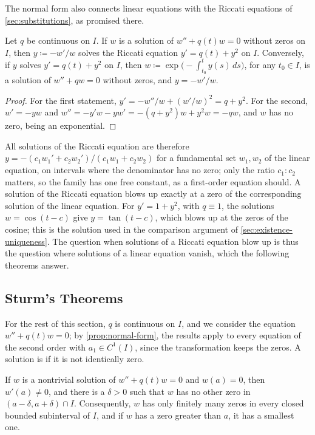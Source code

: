 The normal form also connects linear equations with the Riccati equations of \cref{sec:substitutions}, as promised there.

\begin{proposition}
\label{prop:riccati-linear}
Let $q$ be continuous on $I$. If $w$ is a solution of $w''+q(t)w=0$ without zeros on $I$, then $y\coloneqq-w'/w$ solves the Riccati equation $y'=q(t)+y^2$ on $I$. Conversely, if $y$ solves $y'=q(t)+y^2$ on $I$, then $w\coloneqq\exp\bigl(-\int_{t_0}^ty(s)\,ds\bigr)$, for any $t_0\in I$, is a solution of $w''+qw=0$ without zeros, and $y=-w'/w$.
\end{proposition}

\begin{proof}
For the first statement, $y'=-w''/w+(w'/w)^2=q+y^2$. For the second, $w'=-yw$ and $w''=-y'w-yw'=-(q+y^2)w+y^2w=-qw$, and $w$ has no zero, being an exponential.
\end{proof}

All solutions of the Riccati equation are therefore $y=-(c_1w_1'+c_2w_2')/(c_1w_1+c_2w_2)$ for a fundamental set $w_1,w_2$ of the linear equation, on intervals where the denominator has no zero; only the ratio $c_1:c_2$ matters, so the family has one free constant, as a first-order equation should. A solution of the Riccati equation blows up exactly at a zero of the corresponding solution of the linear equation. For $y'=1+y^2$, with $q\equiv1$, the solutions $w=\cos(t-c)$ give $y=\tan(t-c)$, which blows up at the zeros of the cosine; this is the solution used in the comparison argument of \cref{sec:existence-uniqueness}. The question when solutions of a Riccati equation blow up is thus the question where solutions of a linear equation vanish, which the following theorems answer.

\subsection{Sturm's Theorems}

For the rest of this section, $q$ is continuous on $I$, and we consider the equation $w''+q(t)w=0$; by \cref{prop:normal-form}, the results apply to every equation of the second order with $a_1\in C^1(I)$, since the transformation keeps the zeros. A solution is  if it is not identically zero.

\begin{lemma}
\label{lem:simple-zeros}
If $w$ is a nontrivial solution of $w''+q(t)w=0$ and $w(a)=0$, then $w'(a)\ne0$, and there is a $\delta>0$ such that $w$ has no other zero in $(a-\delta,a+\delta)\cap I$. Consequently, $w$ has only finitely many zeros in every closed bounded subinterval of $I$, and if $w$ has a zero greater than $a$, it has a smallest one.
\end{lemma}

